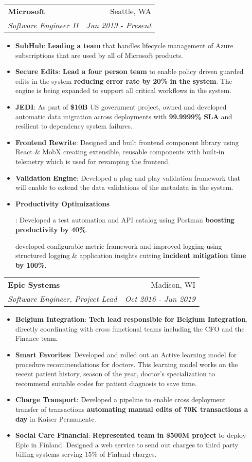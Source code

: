 \documentclass[letterpaper,11pt]{article}
\makeatletter
\newcommand{\resumeItem}[2]{
  \item\small{
    \textbf{#1}{: #2 \vspace{-3pt}}
  }
}
\newcommand{\resumeSubheading}[4]{
  \vspace{-1pt}\item
    \begin{tabular*}{0.97\textwidth}{l@{\extracolsep{\fill}}r}
      \textbf{#1} & #2 \\
      \textit{\small#3} & \textit{\small #4} \\
    \end{tabular*}\vspace{-7pt}
}
\newcommand{\resumeItemListStart}{\begin{itemize}}
\newcommand{\resumeItemListEnd}{\end{itemize}\vspace{-5pt}}
\makeatother
\begin{document}
    \resumeSubheading
      {Microsoft}{Seattle, WA}
      {Software Engineer II}{Jun 2019 - Present}
      \resumeItemListStart
        \resumeItem{SubHub}
          {\textbf{Leading a team} that handles lifecycle management of Azure subscriptions that are used by all of Microsoft products.}
        \resumeItem{Secure Edits}
          {\textbf{Lead a four person team} to enable policy driven guarded edits in the system \textbf{reducing error rate by 20\% in the system}. The engine is being expanded to support all critical workflows in the system.}
        \resumeItem{JEDI}
          {As part of \textbf{\$10B} US government project, owned and developed automatic data migration across deployments with \textbf{99.9999\% SLA} and resilient to dependency system failures.}
        \resumeItem{Frontend Rewrite}
          {Designed and built frontend component library using React \& MobX creating extensible, reusable components with built-in telemetry which is used for revamping the frontend.}
        \resumeItem{Validation Engine}
          {Developed a plug and play validation framework that will enable to extend the data validations of the metadata in the system.}
        \resumeItem{Productivity Optimizations}
          {Developed a test automation and API catalog using Postman \textbf{boosting productivity by 40\%}.
          
          developed configurable metric framework and improved logging using structured logging \& application insights cutting \textbf{incident mitigation time by 100\%}.}
        \resumeItemListEnd

    \resumeSubheading
      {Epic Systems}{Madison, WI}
      {Software Engineer, Project Lead}{Oct 2016 - Jun 2019}
      \resumeItemListStart
        \resumeItem{Belgium Integration}
          {\textbf{Tech lead responsible for Belgium Integration}, directly coordinating with cross functional teams including the CFO and the Finance team.}
        \resumeItem{Smart Favorites}
          {Developed and rolled out an Active learning model for procedure recommendations for doctors.  This learning model works on the recent patient history, season of the year, doctor’s specialization to recommend suitable codes for patient diagnosis to save time.}
        \resumeItem{Charge Transport}
          {Developed a pipeline to enable cross deployment transfer of transactions \textbf{automating manual edits of 70K transactions a day} in Kaiser Permanente.}
        \resumeItem{Social Care Financial}
          {\textbf{Represented team in \$500M project} to deploy Epic in Finland. Designed a web service to send out charges to third party billing systems serving 15\% of Finland charges.}
      \resumeItemListEnd
\end{document}
